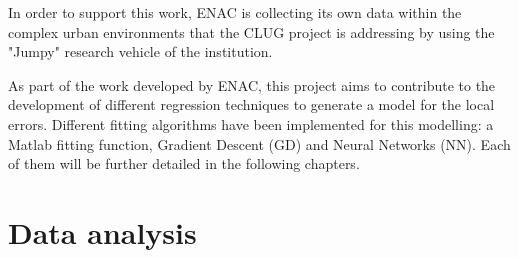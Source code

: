 \documentclass[a4paper, report, oneside, UKenglish]{memoir}
\begin{document}
In order to support this work, ENAC is collecting its own data within the complex urban environments that the CLUG project is addressing by using the "Jumpy" research vehicle of the institution.

As part of the work developed by ENAC, this project aims to contribute to the development of different regression techniques to generate a model for the local errors. Different fitting algorithms have been implemented for this modelling: a Matlab fitting function, Gradient Descent (GD) and Neural Networks (NN). Each of them will be further detailed in the following chapters. 




        


\chapter{Data analysis}\label{ch:data_analysis}
\end{document}
